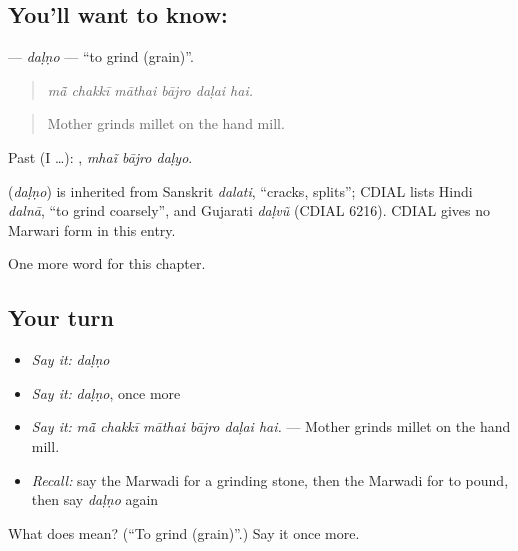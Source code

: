 \subsection*{You'll want to know: }
\textbf{} — \emph{daḷṇo} — \textquotedblleft{}to grind (grain)\textquotedblright{}.

\begin{quote}
     
\end{quote}

\begin{quote}
\emph{mā̃ chakkī māthai bājro daḷai hai.}
\end{quote}

\begin{quote}
Mother grinds millet on the hand mill.
\end{quote}

Past (I …):   , \emph{mhaĩ bājro daḷyo}.

\begin{cousinweb}
\textbf{} (\emph{daḷṇo}) is inherited from Sanskrit \emph{dalati}, \textquotedblleft{}cracks, splits\textquotedblright{}; CDIAL lists Hindi \emph{dalnā}, \textquotedblleft{}to grind coarsely\textquotedblright{}, and Gujarati \emph{daḷvũ} (CDIAL 6216). CDIAL gives no Marwari form in this entry.
\end{cousinweb}

\begin{grammarlens}[title={What you've built}]
One more word for this chapter.
\end{grammarlens}

\subsection*{Your turn}
\begin{itemize}
\raggedright
  \item \emph{Say it:} \emph{daḷṇo}
  \item \emph{Say it:} \emph{daḷṇo}, once more
  \item \emph{Say it:} \emph{mā̃ chakkī māthai bājro daḷai hai.} — Mother grinds millet on the hand mill.
  \item \emph{Recall:} say the Marwadi for a grinding stone, then the Marwadi for to pound, then say \emph{daḷṇo} again
\end{itemize}

\begin{tcolorbox}[breakable,colback=teal!4,colframe=teal!35!black,title={Before you move on}]
What does  mean? (\textquotedblleft{}To grind (grain)\textquotedblright{}.) Say it once more.
\end{tcolorbox}
